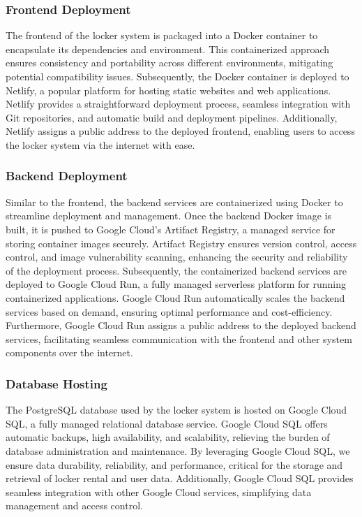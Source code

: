 \subsubsection{Frontend Deployment}
The frontend of the locker system is packaged into a Docker container to encapsulate its dependencies and environment. This containerized approach ensures consistency and portability across different environments, mitigating potential compatibility issues. Subsequently, the Docker container is deployed to Netlify, a popular platform for hosting static websites and web applications. Netlify provides a straightforward deployment process, seamless integration with Git repositories, and automatic build and deployment pipelines. Additionally, Netlify assigns a public address to the deployed frontend, enabling users to access the locker system via the internet with ease.

\subsubsection{Backend Deployment}
Similar to the frontend, the backend services are containerized using Docker to streamline deployment and management. Once the backend Docker image is built, it is pushed to Google Cloud's Artifact Registry, a managed service for storing container images securely. Artifact Registry ensures version control, access control, and image vulnerability scanning, enhancing the security and reliability of the deployment process. Subsequently, the containerized backend services are deployed to Google Cloud Run, a fully managed serverless platform for running containerized applications. Google Cloud Run automatically scales the backend services based on demand, ensuring optimal performance and cost-efficiency. Furthermore, Google Cloud Run assigns a public address to the deployed backend services, facilitating seamless communication with the frontend and other system components over the internet.

\subsubsection{Database Hosting}
The PostgreSQL database used by the locker system is hosted on Google Cloud SQL, a fully managed relational database service. Google Cloud SQL offers automatic backups, high availability, and scalability, relieving the burden of database administration and maintenance. By leveraging Google Cloud SQL, we ensure data durability, reliability, and performance, critical for the storage and retrieval of locker rental and user data. Additionally, Google Cloud SQL provides seamless integration with other Google Cloud services, simplifying data management and access control.

